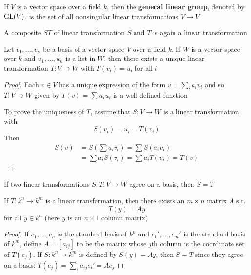 \documentclass[11pt]{article}
\begin{document}
\begin{definition}[]
If \(V\) is a vector space over a field \(k\), then the \textbf{general linear group},
denoted by \(\text{GL}(V)\), is the set of all nonsingular linear transformations 
\(V\to V\)
\end{definition}

A composite \(ST\) of linear transformation \(S\) and \(T\) is again a linear
transformation 

\begin{theorem}[]
\label{thm3.92}
Let \(v_1,\dots,v_n\) be a basis of a vector space \(V\) over a field \(k\). If
\(W\) is a vector space over \(k\) and \(u_1,\dots,u_n\) is a list in \(W\), then
there exists a unique linear transformation \(T:V\to W\) with \(T(v_i)=u_i\)
for all \(i\)
\end{theorem}

\begin{proof}
Each \(v\in V\) has a unique expression of the form \(v=\sum_ia_iv_i\) and
so \(T:V\to W\) given by \(T(v)=\sum a_iu_i\) is a well-defined function

To prove the uniqueness of \(T\), assume that \(S:V\to W\) is a linear
transformation with 
\begin{equation*}
S(v_i)=u_i=T(v_i)
\end{equation*}
Then 
\begin{align*}
S(v)&=S(\sum a_iv_i)=\sum S(a_iv_i)\\
&=\sum a_iS(v_i)=\sum a_iT(v_i)=T(v)
\end{align*}
\end{proof}

\begin{corollary}[]
If two linear transformations \(S,T:V\to W\) agree on a basis, then \(S=T\)
\end{corollary}

\begin{proposition}[]
If \(T:k^n\to k^m\) is a linear transformation, then there exists an
\(m\times n\) matrix \(A\) s.t.
\begin{equation*}
T(y)=Ay
\end{equation*}
for all \(y\in k^n\) (here \(y\) is an \(n\times 1\) column matrix) 
\end{proposition}

\begin{proof}
If \(e_1,\dots,e_n\) is the standard basis of \(k^n\) and
\(e_1',\dots,e_m'\) is the standard basis of \(k^m\), define \(A=[a_{ij}]\)
to be the matrix whose \(j\)th column is the coordinate set of \(T(e_j)\).
If \(S:k^n\to k^m\) is defined by \(S(y)=Ay\), then \(S=T\) since they agree
on a basis: \(T(e_j)=\sum_ia_{ij}e_i'=Ae_j\)
\end{proof}
\end{document}
